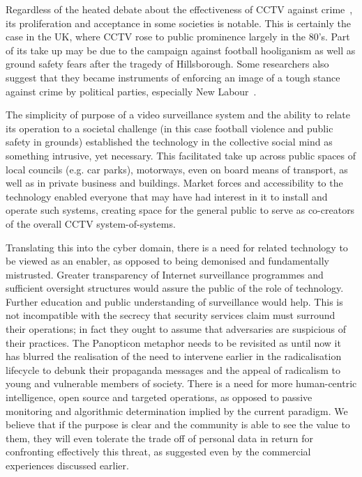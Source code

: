\documentclass{llncs}
\begin{document}
Regardless of the heated debate about the effectiveness of CCTV against crime~\cite{Ditton,Woodhouse}, its proliferation and acceptance in some societies is notable. This is certainly the case in the UK, where CCTV rose to public prominence largely in the 80's. Part of its take up may be due to the campaign against football hooliganism as well as ground safety fears after the tragedy of Hillsborough. Some researchers also suggest that they became instruments of enforcing an image of a tough stance against crime by political parties, especially New Labour~\cite{McHill}.

The simplicity of purpose of a video surveillance system and the ability to relate its operation to a societal challenge (in this case football violence and public safety in grounds) established the technology in the collective social mind as something intrusive, yet necessary. This facilitated take up across public spaces of local councils (e.g. car parks), motorways, even on board means of transport, as well as in private business and buildings. Market forces and accessibility to the technology enabled everyone that may have had interest in it to install and operate such systems, creating space for the general public to serve as co-creators of the overall CCTV system-of-systems.

Translating this into the cyber domain, there is a need for related technology to be viewed as an enabler, as opposed to being demonised and fundamentally mistrusted. Greater transparency of Internet surveillance programmes and sufficient oversight structures would assure the public of the role of technology. Further education and public understanding of surveillance would help. This is not incompatible with the secrecy that security services claim must surround their operations; in fact they ought to assume that adversaries are suspicious of their practices. The Panopticon metaphor needs to be revisited as until now it has blurred the realisation of the need to intervene earlier in the radicalisation lifecycle to debunk their propaganda messages and the appeal of radicalism to young and vulnerable members of society. There is a need for more human-centric intelligence, open source and targeted operations, as opposed to passive monitoring and algorithmic determination implied by the current paradigm. We believe that if the purpose is clear and the community is able to see the value to them, they will even tolerate the trade off of personal data in return for confronting effectively this threat, as suggested even by the commercial experiences discussed earlier.
\end{document}
